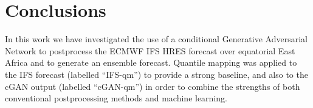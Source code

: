 \documentclass{article}
\begin{document}




\section{Conclusions}


In this work we have investigated the use of a conditional Generative Adversarial Network to postprocess the ECMWF IFS HRES forecast over equatorial East Africa and to generate an ensemble forecast. Quantile mapping was applied to the IFS forecast (labelled ``IFS-qm'') to provide a strong baseline, and also to the cGAN output (labelled ``cGAN-qm'') in order to combine the strengths of both conventional postprocessing methods and machine learning.
\end{document}
